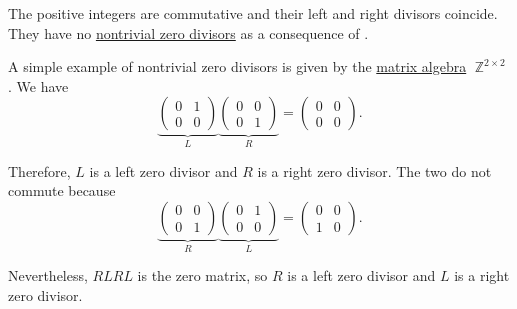 \begin{example}\label{ex:def:divisibility}
  \hfill
  \begin{thmenum}
     The positive integers are commutative and their left and right divisors coincide. They have no \hyperref[def:divisibility/zero]{nontrivial zero divisors} as a consequence of .

     A simple example of nontrivial zero divisors is given by the \hyperref[def:matrix_algebra]{matrix algebra} \( \BbbZ^{2 \times 2} \). We have
    \begin{equation*}
      \underbrace
      {
        \begin{pmatrix}
          0 & 1 \\
          0 & 0
        \end{pmatrix}
      }_{L}
      \underbrace
      {
        \begin{pmatrix}
          0 & 0 \\
          0 & 1
        \end{pmatrix}
      }_{R}
      =
      \begin{pmatrix}
        0 & 0 \\
        0 & 0
      \end{pmatrix}.
    \end{equation*}

    Therefore, \( L \) is a left zero divisor and \( R \) is a right zero divisor. The two do not commute because
    \begin{equation*}
      \underbrace
      {
        \begin{pmatrix}
          0 & 0 \\
          0 & 1
        \end{pmatrix}
      }_{R}
      \underbrace
      {
        \begin{pmatrix}
          0 & 1 \\
          0 & 0
        \end{pmatrix}
      }_{L}
      =
      \begin{pmatrix}
        0 & 0 \\
        1 & 0
      \end{pmatrix}.
    \end{equation*}

    Nevertheless, \( RLRL \) is the zero matrix, so \( R \) is a left zero divisor and \( L \) is a right zero divisor.
  \end{thmenum}
\end{example}

